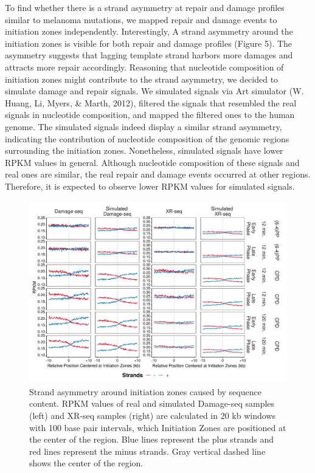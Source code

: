 To find whether there is a strand asymmetry at repair and damage profiles similar to melanoma mutations, we mapped repair and damage events to initiation zones independently. Interestingly, A strand asymmetry around the initiation zones is visible for both repair and damage profiles (Figure 5). The asymmetry suggests that lagging template strand harbors more damages and attracts more repair accordingly. Reasoning that nucleotide composition of initiation zones might contribute to the strand asymmetry, we decided to simulate damage and repair signals. We simulated signals via Art simulator (W. Huang, Li, Myers, \& Marth, 2012), filtered the signals that resembled the real signals in nucleotide composition, and mapped the filtered ones to the human genome. The simulated signals indeed display a similar strand asymmetry, indicating the contribution of nucleotide composition of the genomic regions surrounding the initiation zones. Nonetheless, simulated signals have lower RPKM values in general. Although nucleotide composition of these signals and real ones are similar, the real repair and damage events occurred at other regions. Therefore, it is expected to observe lower RPKM values for simulated signals. 

\begin{figure}[H]
    \begin{center}
    \includegraphics[width=\textwidth]{Chapters/4_results/figures/fig5}
    \caption[Strand asymmetry around initiation zones caused by sequence content.]{Strand asymmetry around initiation zones caused by sequence content. RPKM values of real and simulated Damage-seq samples (left) and XR-seq samples (right) are calculated in 20 kb windows with 100 base pair intervals, which Initiation Zones are positioned at the center of the region. Blue lines represent the plus strands and red lines represent the minus strands. Gray vertical dashed line shows the center of the region.}
    \label{fig:simulation}
    \end{center}
    \end{figure}

